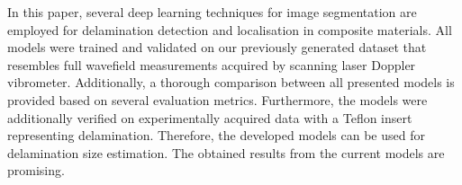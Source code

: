 In this paper, several deep learning techniques for image segmentation are employed for delamination detection and localisation in composite materials.
All models were trained and validated on our previously generated dataset that resembles full wavefield measurements acquired by scanning laser Doppler vibrometer.
Additionally, a thorough comparison between all presented models is provided based on several evaluation metrics.
Furthermore, the models were additionally verified on experimentally acquired data with a Teflon insert representing delamination.
Therefore, the developed models can be used for delamination size estimation.
The obtained results from the current models are promising.

